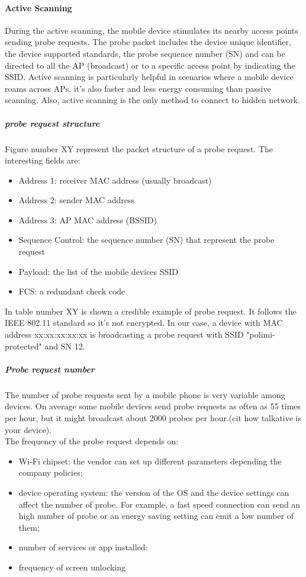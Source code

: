 \paragraph{Active Scanning}
During the active scanning, the mobile device stimulates its nearby access points sending probe requests. The probe packet includes the device unique identifier, the device supported standards, the probe sequence number (SN) and can be directed to all the AP (broadcast) or to a specific access point by indicating the SSID. 
Active scanning is particularly helpful in scenarios where a mobile device roams across APs, it's also faster and less energy consuming than passive scanning.
Also, active scanning is the only method to connect to hidden network.
 
\subparagraph{probe request structure}
Figure number XY represent the packet structure of a probe request. The interesting fields are:
\begin{itemize}
\item Address 1: receiver MAC address (usually broadcast)
\item Address 2: sender MAC address
\item Address 3: AP MAC address (BSSID)
\item Sequence Control: the sequence number (SN) that represent the probe request
\item Payload: the list of the mobile devices SSID
\item FCS: a redundant check code 
\end{itemize}

In table number XY is shown a credible example of probe request. It follows the IEEE 802.11 standard so it's not encrypted. In our case, a device with MAC address xx:xx:xx:xx:xx is broadcasting a probe request with SSID "polimi-protected" and SN 12.\\

\subparagraph{Probe request number}
The number of probe requests sent by a mobile phone is very variable among devices. On average some mobile devices send probe requests as often as 55 times per hour, but it might broadcast about 2000 probes per hour.(cit how talkative is your device).\\
The frequency of the probe request depends on:
\begin{itemize}
\item Wi-Fi chipset: the vendor can set up different parameters depending the company policies;
\item device operating system: the version of the OS and the device settings can affect the number of probe. For example, a fast speed connection can send an high number of probe or an energy saving setting can emit a low number of them;
\item number of services or app installed: 
\item frequency of screen unlocking
\end{itemize}


